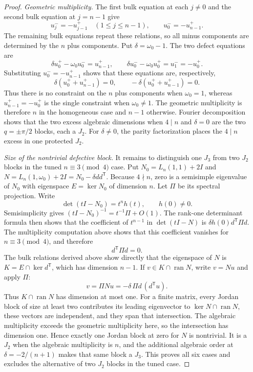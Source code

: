 \documentclass[twoside,10pt]{article}
\numberwithin{equation}{section}
\theoremstyle{slbody}
\theoremstyle{definition}
\theoremstyle{remark}
\begin{document}
\begin{proof}
\smallskip
\noindent\emph{Geometric multiplicity.}
The first bulk equation at each $j\ne0$ and the second bulk equation at
$j=n-1$ give
\[
 u_j^-=-u_{j-1}^+\quad(1\leq j\leq n-1),
 \qquad
 u_0^-=-u_{n-1}^+.
\]
The remaining bulk equations repeat these relations, so all minus
components are determined by the $n$ plus components.  Put
$\delta=\omega_0-1$.  The two defect equations are
\[
 \delta u_0^+-\omega_0u_0^-=u_{n-1}^+,
 \qquad
 \delta u_0^--\omega_0u_0^+=u_1^-=-u_0^+.
\]
Substituting $u_0^-=-u_{n-1}^+$ shows that these equations are,
respectively,
\[
 \delta(u_0^++u_{n-1}^+)=0,
 \qquad
 -\delta(u_0^++u_{n-1}^+)=0.
\]
Thus there is no constraint on the $n$ plus components when
$\omega_0=1$, whereas $u_{n-1}^+=-u_0^+$ is the single constraint when
$\omega_0\ne1$.  The geometric multiplicity is therefore $n$ in the
homogeneous case and $n-1$ otherwise.  Fourier decomposition
shows that the two excess algebraic dimensions when $4\mid n$ and
$\delta=0$ are the two $q=\pm\pi/2$ blocks, each a $J_2$.  For
$\delta\ne0$, the parity factorization places the $4\mid n$ excess in
one protected $J_2$.

\smallskip
\noindent\emph{Size of the nontrivial defective block.}
It remains to distinguish one $J_3$ from two $J_2$ blocks in the tuned
$n\equiv3\pmod4$ case.  Put $N_0=L_n(1,1)+2I$ and
$N=L_n(1,\omega_0)+2I=N_0-\delta dd^{\mathsf T}$.  Because
$4\nmid n$, zero is a semisimple eigenvalue of $N_0$ with eigenspace
$E=\ker N_0$ of dimension $n$.  Let $\Pi$ be its spectral projection.
Write
\[
 \det(tI-N_0)=t^nh(t),\qquad h(0)\ne0.
\]
Semisimplicity gives
$(tI-N_0)^{-1}=t^{-1}\Pi+O(1)$.  The rank-one determinant formula then
shows that the coefficient of $t^{n-1}$ in $\det(tI-N)$ is
$\delta h(0)d^{\mathsf T}\Pi d$.
The multiplicity computation above shows that this coefficient vanishes
for $n\equiv3\pmod4$, and therefore
\begin{equation}\label{eq:flat-isotropic-projection}
 d^{\mathsf T}\Pi d=0.
\end{equation}
The bulk relations derived above show directly that the eigenspace of $N$ is
$K=E\cap\ker d^{\mathsf T}$, which has dimension $n-1$.  If
$v\in K\cap\operatorname{ran}N$, write $v=Nu$ and apply $\Pi$:
\begin{equation}\label{eq:flat-range-line}
 v=\Pi Nu=-\delta\,\Pi d\,(d^{\mathsf T}u).
\end{equation}
Thus $K\cap\operatorname{ran}N$ has dimension at most one.  For a finite
matrix, every Jordan block of size at least two contributes its leading
eigenvector to $\ker N\cap\operatorname{ran}N$, these vectors are
independent, and they span that intersection.  The algebraic multiplicity
exceeds the geometric multiplicity here, so the intersection has
dimension one.  Hence exactly one Jordan block at zero for $N$ is
nontrivial.  It is a $J_2$ when the algebraic multiplicity is $n$, and
the additional algebraic order at $\delta=-2/(n+1)$ makes that same
block a $J_3$.  This proves all six cases and excludes the alternative
of two $J_2$ blocks in the tuned case.


\end{proof}
\end{document}
